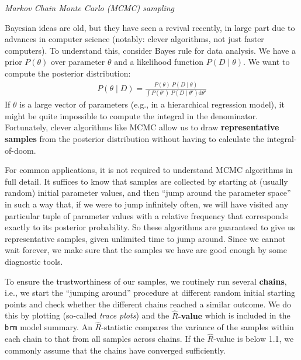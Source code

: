 \documentclass[nobib]{tufte-handout}
\begin{document}
\begin{InfoBox}[]
\centering
\colorbox{mygray}{\centering
  \begin{minipage}{1\textwidth}

    \emph{Markov Chain Monte Carlo (MCMC) sampling}
    \medskip
 
    Bayesian ideas are old, but they have seen a revival recently, in large part due to
    advances in computer science (notably: clever algorithms, not just faster computers). To
    understand this, consider Bayes rule for data analysis. We have a prior $P(\theta)$ over
    parameter $\theta$ and a likelihood function $P(D\mid\theta)$. We want to compute
    the posterior distribution:
    \begin{eqnarray*}
      P(\theta \mid D) = \frac{P(\theta) \ P(D \mid \theta)}{ \int P(\theta') \ P(D \mid
      \theta') \textrm{d}\theta'}
    \end{eqnarray*}
    If $\theta$ is a large vector of parameters (e.g., in a hierarchical regression model), it
    might be quite impossible to compute the integral in the denominator. Fortunately, clever
    algorithms like MCMC allow us to draw \textbf{representative samples} from the
    posterior distribution without having to calculate the integral-of-doom.

    \medskip
    
    For common applications, it is not required to understand MCMC algorithms in full detail.
    It suffices to know that samples are collected by starting at (usually random) initial
    parameter values, and then ``jump around the parameter space'' in such a way that, if we
    were to jump infinitely often, we will have visited any particular tuple of parameter
    values with a relative frequency that corresponds exactly to its posterior probability. So
    these algorithms are guaranteed to give us representative samples, given unlimited time to
    jump around. Since we cannot wait forever, we make sure that the samples we have are good
    enough by some diagnostic tools.

    \medskip
    
    To ensure the trustworthiness of our samples, we routinely run several \textbf{chains}, i.e., we
    start the ``jumping around'' procedure at different random initial starting points and check whether
    the different chains reached a similar outcome. We do this by plotting (so-called
    \emph{trace plots}) and the \textbf{$\hat{R}$-value} which is included in the \texttt{brm}
    model summary. An $\hat{R}$-statistic compares the variance of the samples within each
    chain to that from all samples across chains. If the $\hat{R}$-value is
    below 1.1, we commonly assume that the chains have converged sufficiently.


\end{minipage}}
\end{InfoBox}
\end{document}
